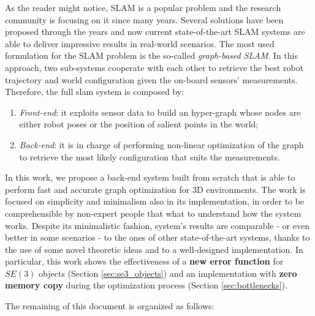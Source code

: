 As the reader might notice, SLAM is a popular problem and the research community is focusing on it since many years. Several solutions have been proposed through the years and now current state-of-the-art SLAM systems are able to deliver impressive results in real-world scenarios. The most used formulation for the SLAM problem is the so-called \textit{graph-based SLAM}. In this approach, two sub-systems cooperate with each other to retrieve the best robot trajectory and world configuration given the on-board sensors' measurements. Therefore, the full slam system is composed by:

\begin{enumerate}
    \item \textit{Front-end}: it exploits sensor data to build an hyper-graph whose nodes are either robot poses or the position of salient points in the world;
    \item \textit{Back-end}: it is in charge of performing non-linear optimization of the graph to retrieve the most likely configuration that suits the measurements.
\end{enumerate}

In this work, we propose a back-end system built from scratch that is able to perform fast and accurate graph optimization for 3D environments. The work is focused on simplicity and minimalism also in its implementation, in order to be comprehensible by non-expert people that what to understand how the system works. Despite its minimalistic fashion, system's results are comparable - or even better in some scenarios - to the ones of other state-of-the-art systems, thanks to the use of some novel theoretic ideas and to a well-designed implementation. In particular, this work shows the effectiveness of a \textbf{new error function} for $SE(3)$ objects (Section \ref{sec:se3_objects}) and an implementation with \textbf{zero memory copy} during the optimization process (Section \ref{sec:bottlenecks}).

\vspace{20px}

\noindent The remaining of this document is organized as follows:

